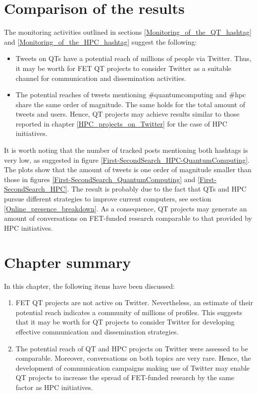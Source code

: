 \section{Comparison of the results} \label{Comparison_of_the_results}
The monitoring activities outlined in sections \ref{Monitoring_of_the_QT_hashtag} and \ref{Monitoring_of_the_HPC_hashtag} suggest the following:

\begin{itemize}
 \item Tweets on QTs have a potential reach of millions of people via Twitter. Thus, it may be worth for FET QT projects to consider Twitter as a suitable channel for communication and dissemination activities.
 \item The potential reaches of tweets mentioning \#quantumcomputing and \#hpc share the same order of magnitude. The same holds for the total amount of tweets and users. Hence, QT projects may achieve results similar to those reported in chapter \ref{HPC_projects_on_Twitter} for the case of HPC initiatives. 
\end{itemize}

It is worth noting that the number of tracked posts mentioning both hashtags is very low, as suggested in figure \ref{First-SecondSearch_HPC-QuantumComputing}. The plots show that the amount of tweets is one order of magnitude smaller than those in figures \ref{First-SecondSearch_QuantumComputing} and \ref{First-SecondSearch_HPC}. The result is probably due to the fact that QTs and HPC pursue different strategies to improve current computers, see section \ref{Online_presence_breakdown}. As a consequence, QT projects may generate an amount of conversations on FET-funded research comparable to that provided by HPC initiatives. 

\section{Chapter summary} 
In this chapter, the following items have been discussed: 

\begin{enumerate}
 \item FET QT projects are not active on Twitter. Nevertheless, an estimate of their potential reach indicates a community of millions of profiles. This suggests that it may be worth for QT projects to consider Twitter for developing effective communication and dissemination strategies.
 \item The potential reach of QT and HPC projects on Twitter were assessed to be comparable. Moreover, conversations on both topics are very rare. Hence, the development of communication campaigns making use of Twitter may enable QT projects to increase the spread of FET-funded research by the same factor as HPC initiatives.         
\end{enumerate}